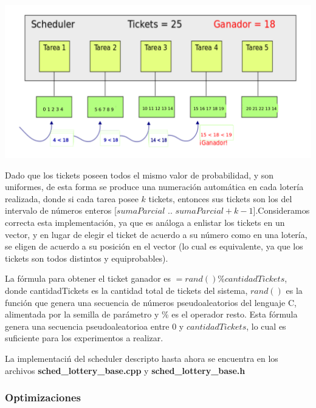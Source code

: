 \vspace{2mm}

\includegraphics[width=1\textwidth]{./Graficos/loteria.png}
\begin{center}
\end{center}

\vspace{2mm}

Dado que los tickets poseen todos el mismo valor de probabilidad, y son uniformes, de esta forma se produce una numeraci\'on autom\'atica en cada loter\'ia realizada, donde si cada tarea posee $k$ tickets, entonces sus tickets son los del intervalo de n\'umeros enteros [$sumaParcial$ .. $sumaParcial + k-1$].Consideramos correcta esta implementaci\'on, ya que es an\'aloga a enlistar los tickets en un vector, y en lugar de elegir el ticket de acuerdo a su n\'umero como en una loter\'ia, se eligen de acuerdo a su posici\'on en el vector (lo cual es equivalente, ya que los tickets son todos distintos y equiprobables).

\vspace{2mm}

La f\'ormula para obtener el ticket ganador es $ = rand() \% cantidadTickets$, donde cantidadTickets es la cantidad total de tickets del sistema, $rand()$ es la funci\'on que genera una secuencia de n\'umeros pseudoaleatorios del lenguaje C, alimentada por la semilla de par\'ametro y \% es el operador resto. Esta f\'ormula genera una secuencia pseudoaleatorioa entre $0$ y $cantidadTickets$, lo cual es suficiente para los experimentos a realizar.

\vspace{2mm}

La implementaci\'n del scheduler descripto hasta ahora se encuentra en los archivos \textbf{sched\_lottery\_base.cpp} y \textbf{sched\_lottery\_base.h}

\subsubsection{Optimizaciones}

